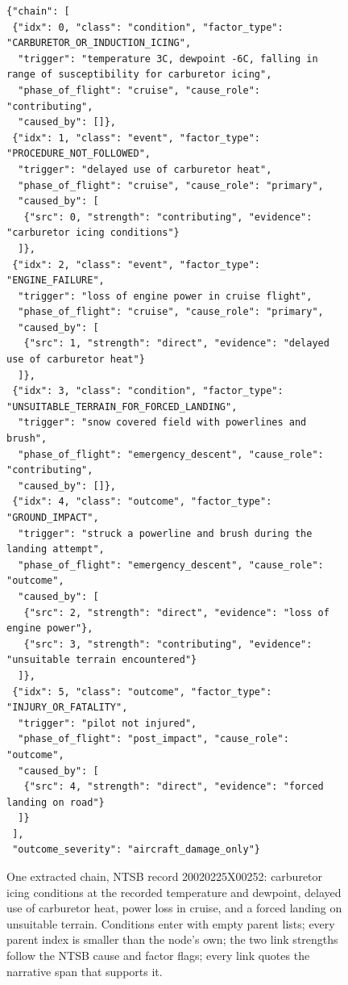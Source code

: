 \begin{figure}[H]
\centering
\begin{lstlisting}[style=schema]
{"chain": [
 {"idx": 0, "class": "condition", "factor_type": "CARBURETOR_OR_INDUCTION_ICING",
  "trigger": "temperature 3C, dewpoint -6C, falling in range of susceptibility for carburetor icing",
  "phase_of_flight": "cruise", "cause_role": "contributing",
  "caused_by": []},
 {"idx": 1, "class": "event", "factor_type": "PROCEDURE_NOT_FOLLOWED",
  "trigger": "delayed use of carburetor heat",
  "phase_of_flight": "cruise", "cause_role": "primary",
  "caused_by": [
   {"src": 0, "strength": "contributing", "evidence": "carburetor icing conditions"}
  ]},
 {"idx": 2, "class": "event", "factor_type": "ENGINE_FAILURE",
  "trigger": "loss of engine power in cruise flight",
  "phase_of_flight": "cruise", "cause_role": "primary",
  "caused_by": [
   {"src": 1, "strength": "direct", "evidence": "delayed use of carburetor heat"}
  ]},
 {"idx": 3, "class": "condition", "factor_type": "UNSUITABLE_TERRAIN_FOR_FORCED_LANDING",
  "trigger": "snow covered field with powerlines and brush",
  "phase_of_flight": "emergency_descent", "cause_role": "contributing",
  "caused_by": []},
 {"idx": 4, "class": "outcome", "factor_type": "GROUND_IMPACT",
  "trigger": "struck a powerline and brush during the landing attempt",
  "phase_of_flight": "emergency_descent", "cause_role": "outcome",
  "caused_by": [
   {"src": 2, "strength": "direct", "evidence": "loss of engine power"},
   {"src": 3, "strength": "contributing", "evidence": "unsuitable terrain encountered"}
  ]},
 {"idx": 5, "class": "outcome", "factor_type": "INJURY_OR_FATALITY",
  "trigger": "pilot not injured",
  "phase_of_flight": "post_impact", "cause_role": "outcome",
  "caused_by": [
   {"src": 4, "strength": "direct", "evidence": "forced landing on road"}
  ]}
 ],
 "outcome_severity": "aircraft_damage_only"}
\end{lstlisting}
\caption{One extracted chain, NTSB record 20020225X00252: carburetor
icing conditions at the recorded temperature and dewpoint, delayed use of
carburetor heat, power loss in cruise, and a forced landing on unsuitable
terrain. Conditions enter with empty parent lists; every parent index is
smaller than the node's own; the two link strengths follow the NTSB cause and
factor flags; every link quotes the narrative span that supports it.}
\label{fig:example}
\end{figure}
